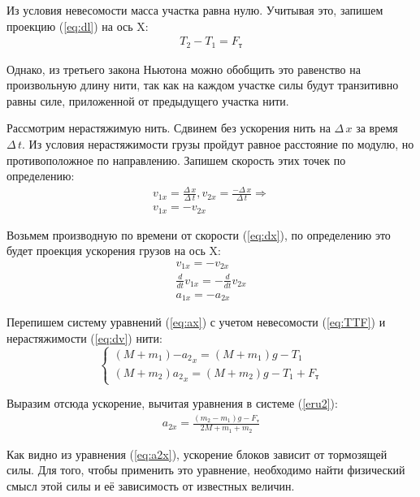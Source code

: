 \documentclass[a4paper,12pt]{report}
\begin{document}
Из условия невесомости масса участка равна нулю. Учитывая это, запишем проекцию (\ref{eq:dl}) на ось X:
\begin{gather}
\label{eq:TTF}
	T_2-T_1=F_\text{т}
\end{gather}

Однако, из третьего закона Ньютона можно обобщить это равенство на произвольную длину нити, так как на каждом участке силы будут транзитивно равны силе, приложенной от предыдущего участка нити.

Рассмотрим нерастяжимую нить. Сдвинем без ускорения нить на $\Delta\,x$ за время $\Delta\,t$. Из условия нерастяжимости грузы пройдут равное расстояние по модулю, но противоположное по направлению. Запишем скорость этих точек по определению: 
\begin{gather}
	\label{eq:dx}
	v_{1x}=\frac{\Delta\,x}{\Delta\,t},	v_{2x}=\frac{-\Delta\,x}{\Delta\,t}\Rightarrow\\
	v_{1x}=-v_{2x}
\end{gather}

Возьмем производную по времени от скорости (\ref{eq:dx}), по определению это будет проекция ускорения грузов на ось X:
\begin{gather}
	v_{1x}=-v_{2x}\\
	\frac{d}{dt}{v_{1x}}=-\frac{d}{dt}{v_{2x}}\\
	a_{1x}=-a_{2x}\label{eq:dv}
\end{gather}

Перепишем систему уравнений (\ref{eq:ax}) с учетом невесомости (\ref{eq:TTF}) и нерастяжимости (\ref{eq:dv}) нити:
\begin{equation}
\begin{cases}
	(M+m_1){-{a_2}_x}=(M+m_1){g}-{T_1}\\
	(M+m_2){{a_2}_x}=(M+m_2){g}-{T_1+F_\text{т}}\label{eru2}
 \end{cases}
\end{equation}

Выразим отсюда ускорение, вычитая уравнения в системе (\ref{eru2}):
\begin{gather}
	\label{eq:a2x}
	a_{2x}=\frac{(m_2-m_1)g-F_\text{т}}{2M+m_1+m_2}
\end{gather}

Как видно из уравнения (\ref{eq:a2x}), ускорение блоков зависит от тормозящей силы. Для того, чтобы применить это уравнение, необходимо найти физический смысл этой силы и её зависимость от известных величин.

\end{document}
